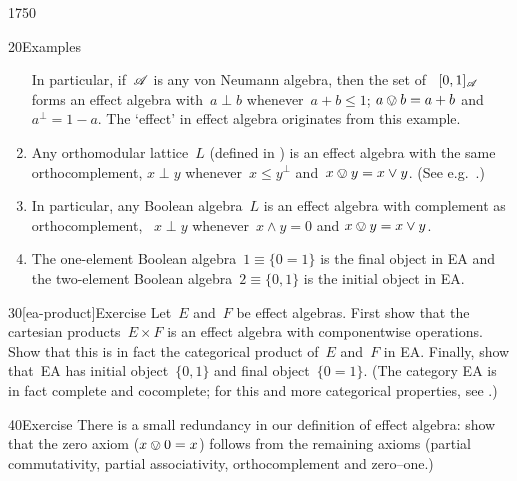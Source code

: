 \begin{parsec}{1750}
\begin{point}{20}{Examples}
\begin{enumerate}
In particular,
    if~$\mathscr{A}$ is any von Neumann algebra,
    then the set of ~$[0,1]_{\mathscr{A}}$
    forms an effect algebra
    with~$a \perp b$ whenever~$a +b \leq 1$;
    $a \ovee b = a + b$ and~$a^\perp = 1-a$.
The `effect' in effect algebra originates from this example.
\item
Any orthomodular lattice~$L$ (defined in )
    is an effect algebra
    with the same orthocomplement,
    $x \perp y$ whenever~$x \leq y^\perp$
    and~$x \ovee y = x \vee y$.  (See e.g.~\cite[Prop.~27]{basmsc}.)
\item
In particular,
    any Boolean algebra~$L$
    is an effect algebra
    with complement as orthocomplement,
    ~$x \perp y$ whenever~$x \wedge y = 0$ and
    $x \ovee y = x \vee y $.
\item
The one-element Boolean algebra~$1 \equiv \{0=1\}$
    is the final object in \textsf{EA}
    and the two-element Boolean algebra~$2 \equiv \{0,1\}$
    is the initial object in \textsf{EA}.
\end{enumerate}
\end{point}

\begin{point}{30}[ea-product]{Exercise}%
Let~$E$ and~$F$ be effect algebras.
First show that the cartesian products~$E \times F$
    is an effect algebra with componentwise operations.
Show that this is in fact the categorical product of~$E$ and~$F$
    in \textsf{EA}.
Finally, show that~\textsf{EA} has initial
    object~$\{0,1\}$
    and final object~$\{0=1\}$.
(The category \textsf{EA} is in fact complete and cocomplete;
    for this and more categorical properties,
        see \cite{corefl}.)
\end{point}

\begin{point}{40}{Exercise}%
There is a small redundancy in our definition of effect algebra:
show that the zero axiom ($x \ovee 0 = x$)
follows from the remaining axioms (partial commutativity,
partial associativity, orthocomplement and zero--one.)
\end{point}


\end{parsec}
